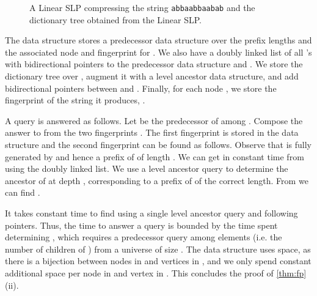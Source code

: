 \documentclass[11pt]{article}
\begin{document}
\begin{figure}[tb]
\begin{center}
{	
}

\caption{A Linear SLP compressing the string \texttt{abbaabbaabab} and the dictionary tree obtained from the Linear SLP.}\label{fig:linslpex1}

\end{center}
\end{figure}

The data structure stores a predecessor data structure over the prefix lengths  and the associated node  and fingerprint  for . We also have a doubly linked list of all 's with bidirectional pointers to the predecessor data structure and .  We store the dictionary tree  over , augment it with a level ancestor data structure, and add bidirectional pointers between  and . Finally, for each node , we store the fingerprint of the string it produces, . 

A query  is answered as follows. Let  be the predecessor of  among . Compose the answer to  from the two fingerprints . The first fingerprint  is stored in the data structure and the second fingerprint  can be found as follows. Observe that  is fully generated by  and hence a prefix of  of length . We can get  in constant time from  using the doubly linked list. We use a level ancestor query  to determine the ancestor of  at depth , corresponding to a prefix of  of the correct length. From  we can find .

It takes constant time to find  using a single level ancestor query and following pointers. Thus, the time to answer a query is bounded by the time spent determining , which requires a predecessor query among  elements (i.e. the number of children of ) from a universe of size . The data structure uses  space, as there is a bijection between nodes in  and vertices in , and we only spend constant additional space per node in  and vertex in . This concludes the proof of \autoref{thm:fp}(ii).
\end{document}
